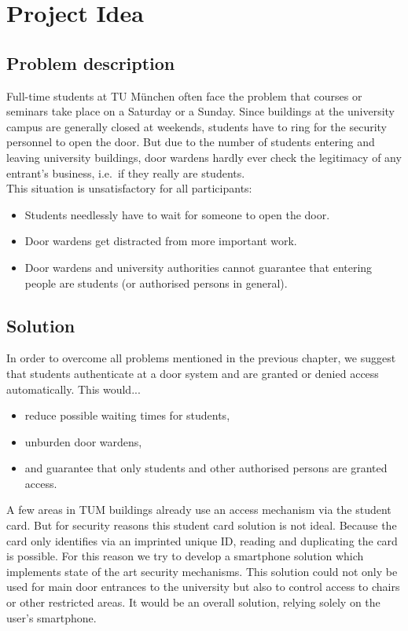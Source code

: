 \section{Project Idea}



\subsection{Problem description}

Full-time students at TU München often face the problem that courses or seminars take place on a Saturday or a Sunday.
Since buildings at the university campus are generally closed at weekends, students have to ring for the security personnel to open the door. But due to the number of students entering and leaving university buildings, door wardens hardly ever check the legitimacy of any entrant's business, i.e.~if they really are students.\\
This situation is unsatisfactory for all participants:

\begin{itemize}
\item Students needlessly have to wait for someone to open the door.
\item Door wardens get distracted from more important work.
\item Door wardens and university authorities cannot guarantee that entering people are students (or authorised persons in general).
\end{itemize}

\subsection{Solution}

In order to overcome all problems mentioned in the previous chapter, we suggest that students authenticate at a door system and are granted or denied access automatically. This would...

\begin{itemize}
\item reduce possible waiting times for students,
\item unburden door wardens,
\item and guarantee that only students and other authorised persons are granted access.
\end{itemize}

A few areas in TUM buildings already use an access mechanism via the student card.
But for security reasons this student card solution is not ideal.
Because the card only identifies via an imprinted unique ID, reading and duplicating the card is possible.
For this reason we try to develop a smartphone solution which implements state of the art security mechanisms.
This solution could not only be used for main door entrances to the university but also to control access to chairs or other restricted areas. It would be an overall solution, relying solely on the user's smartphone.
 
